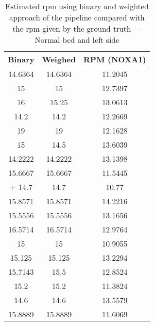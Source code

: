 \begin{table}[h]
    \centering
    \begin{tabular}{|c|c|c|}
 
    \hline 
    Binary & Weighed &RPM (NOXA1) \\ 
    \hline 
   14.6364  & 14.6364 & 11.2045 \\ 
      15  & 15 & 12.7397 \\ 
      16  & 15.25 & 13.0613 \\  
  14.2  & 14.2 & 12.2669 \\ 
      19  & 19 & 12.1628 \\ 
      15  & 14.5 & 13.6039 \\ 
     14.2222  & 14.2222 & 13.1398 \\ 
     15.6667 & 15.6667 & 11.5445 \\ 
+ 14.7 & 14.7 & 10.77  \\ 
     15.8571  & 15.8571 & 14.2216 \\ 
 15.5556 & 15.5556 & 13.1656\\ 
 16.5714 & 16.5714 & 12.9764 \\ 
   15 &  15 & 10.9055 \\ 
15.125 & 15.125 & 13.2294 \\ 
15.7143& 15.5 & 12.8524 \\ 
     15.2 & 15.2 & 11.3824 \\ 
14.6 &  14.6 & 13.5579 \\ 
15.8889 & 15.8889 & 11.6069 \\ 
    \hline 
    \end{tabular}
    \caption{Estimated rpm using binary and weighted approach of the pipeline
    compared with the rpm given by the ground truth -
    - Normal bed and left side}
    \label{tab:LeftNormalStill}

\end{table}
    